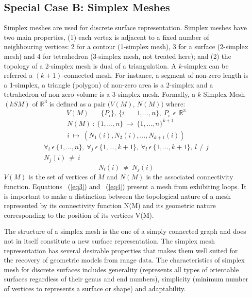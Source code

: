 \documentclass{InsightArticle}
\begin{document}
\subsection{Special Case B: Simplex Meshes}
Simplex meshes are used for discrete surface representation. Simplex meshes have two main properties, (1) each vertex is adjacent to a fixed number of neighbouring vertices: 2 for a contour (1-simplex mesh), 3 for a surface (2-simplex mesh) and 4 for tetrahedron (3-simplex mesh, not treated here); and (2) the topology of a 2-simplex mesh is dual of a triangulation. A $k$-simplex can be referred a $(k+1)$-connected mesh. For instance, a segment of non-zero length is a 1-simplex, a triangle (polygon) of non-zero area is a 2-simplex and a tetrahedron of non-zero volume is a 3-simplex mesh. Formally, a $k$-Simplex Mesh $(kSM)$ of $\mathbb{R}^3$ is defined as a pair $(V(M)$, $N(M))$ \cite{Delingette1994} where:
\begin{equation}
	V(M)~=~\{P_i\},~\{i~=~1,..., n\},~P_i\ ~\epsilon\  ~\mathbb{R}^3
	\label{eq1}
\end{equation}
\begin{equation}
	\begin{array}{c}
		N(M)~:~\{1,...,n\}~\longrightarrow~\{1,...,n\}^{k+1} \\
		i~\longmapsto~(N_1 (i), N_2 (i),...,N_{k+1} (i))
	\end{array}
	\label{eq2}
\end{equation}
\begin{equation}
	\begin{array}{c}
		\forall _i \ \epsilon \ \{1,...,n\},~\forall _j \ \epsilon \ \{1,...,k+1\},~\forall _l \ \epsilon \ \{1,...,k+1\}, \ l \neq j \\
		N_j (i)~\neq~i
	\end{array}
	\label{eq3}
\end{equation}
\begin{equation}
	N_l (i)~\neq~N_j (i)
	\label{eq4}
\end{equation}
$V(M)$ is the set of vertices of $M$ and $N(M)$ is the associated connectivity function. Equations ~(\ref{eq3}) and ~(\ref{eq4}) present a mesh from exhibiting loops. It is important to make a distinction between the topological nature of a mesh represented by its connectivity function N(M) and its geometric nature corresponding to the position of its vertices V(M). 

The structure of a simplex mesh is the one of a simply connected graph and does not in itself constitute a new surface representation. The simplex mesh representation has several desirable properties that makes them well suited for the recovery of geometric models from range data. The characteristics of simplex mesh for discrete surfaces includes generality (represents all types of orientable surfaces regardless of their genus and end numbers), simplicity (minimum number of vertices to represents a surface or shape) and adaptability.
\end{document}
